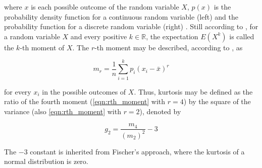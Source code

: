 \noindent where $x$ is each possible outcome of the random variable $X$, $p(x)$ is the probability density function for a continuous random variable (left) and the probability function for a discrete random variable (right) \cite{degroot2012probability}. Still according to , for a random variable $X$ and every positive $k \in \mathbb{R}$, the expectation $E(X^{k})$ is
called the $k$-th moment of $X$. The $r$-th moment may be described, according to , as

\begin{equation}
\label{eqn:rth_moment}
m_{r} = \frac{1}{n}
        \sum_{i=1}^{k}p_{i}(x_{i} - \bar{x})^{r}
\end{equation}

\noindent for every $x_{i}$ in the possible outcomes of $X$. Thus, kurtosis may be defined as the ratio of the fourth moment (\autoref{eqn:rth_moment} with $r = 4$) by the square of the variance (also \autoref{eqn:rth_moment} with $r = 2$), denoted by

\begin{equation}
\label{eqn:kurtosis}
g_{2} = \frac{m_{4}}{(m_{2})^{2}} - 3
\end{equation}

The $-3$ constant is inherited from Fischer's approach, where the kurtosis of a normal distribution is zero.
